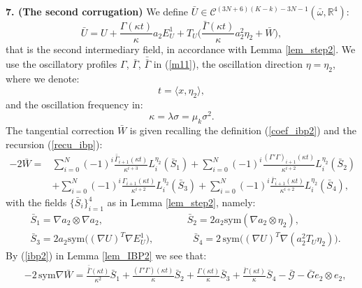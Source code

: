 \documentclass[reqno,twoside,11pt]{amsart}
\newcommand{\sym}{\mathrm{sym}}
\newcommand{\R}{\mathbb{R}}
\newcommand*{\dbar}[1]{\bar{\bar{#1}}}
\numberwithin{equation}{section}
\theoremstyle{plain}
\theoremstyle{definition}
\begin{document}
\smallskip

{\bf 7. (The second corrugation)} We define 
$\bar U\in\mathcal{C}^{(3N+6)(K-k)-3N-1}(\bar\omega, \R^4)$:
\begin{equation}\label{corru2}
\bar U=U+\frac{\Gamma(\kappa t)}{\kappa} a_2E^1_{U} +
T_{U}\Big(\frac{\bar\Gamma(\kappa t)}{\kappa}a_2^2 \eta_2+ \bar W\Big),
\end{equation}
that is the second intermediary field, in accordance with Lemma
\ref{lem_step2}. We use the oscillatory 
profiles $\Gamma$, $\bar\Gamma$, $\dbar\Gamma$ in (\ref{m11}), the oscillation direction 
$\eta=\eta_2$, where we denote:
$$t=\langle x,\eta_2\rangle, $$
and the oscillation frequency in:
$$\kappa = \lambda\sigma = \mu_k\sigma^2.$$ 
The tangential correction $\bar W$ is given recalling the definition
(\ref{coef_ibp2}) and the recursion (\ref{recu_ibp}):
\begin{equation*}
\begin{split}
-2\bar W = & \sum_{i=0}^N (-1)^i \frac{\dbar\Gamma_{i+1}(\kappa
  t)}{\kappa^{i+3}}L_i^{\eta_2}(\bar S_1) 
+ \sum_{i=0}^N (-1)^i \frac{(\Gamma'\Gamma)_{i+1}(\kappa t)}{\kappa^{i+2}}L_i^{\eta_2}(\bar S_2) 
\\ & + \sum_{i=0}^N (-1)^i \frac{\Gamma_{i+1}(\kappa t)}{\kappa^{i+2}}L_i^{\eta_2}(\bar S_3) 
+ \sum_{i=0}^N (-1)^i \frac{\bar\Gamma_{i+1}(\kappa t)}{\kappa^{i+2}}L_i^{\eta_2}(\bar S_4),
\end{split}
\end{equation*}
with the fields $\{\bar S_i\}_{i=1}^4$ as in Lemma \ref{lem_step2}, namely:
\begin{equation}\label{S_second}
\begin{split}
& \bar S_1= \nabla a_2\otimes\nabla a_2, \qquad\qquad\qquad \qquad\;\;
\bar S_2 = 2a_2\sym(\nabla a_2\otimes \eta_2),\\
& \bar S_3 = 2a_2\sym\big((\nabla U)^T\nabla E^1_{U}\big), \qquad\qquad
\bar S_4 =2\,\sym\big((\nabla U)^T\nabla (a_2^2 T_{U}\eta_2)\big).
\end{split}
\end{equation}
By (\ref{ibp2}) in Lemma \ref{lem_IBP2} we see that:
\begin{equation}\label{symWbar}
\begin{split}
& -2\,\sym\nabla \bar W = \frac{\dbar\Gamma(\kappa t)}{\kappa^2} \bar S_1 
+ \frac{(\Gamma'\Gamma)(\kappa t)}{\kappa} \bar S_2 
+ \frac{\Gamma(\kappa t)}{\kappa} \bar S_3+ \frac{\bar\Gamma(\kappa
  t)}{\kappa} \bar S_4  - \bar{\mathcal{G}} - \bar G e_2\otimes e_2, 
\end{split}
\end{equation}
\end{document}
